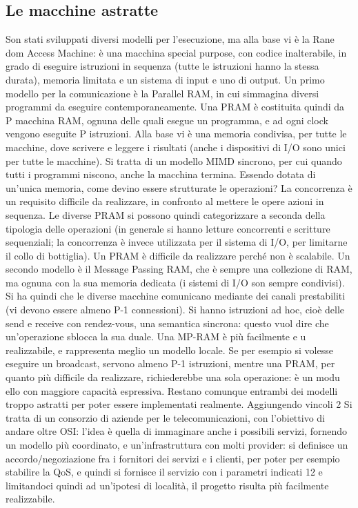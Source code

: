 \subsection{Le macchine astratte}
Son stati sviluppati diversi modelli per l'esecuzione, ma alla base vi è la Rane
dom Access Machine: è una macchina special purpose, con codice inalterabile,
in grado di eseguire istruzioni in sequenza (tutte le istruzioni hanno la stessa
durata), memoria limitata e un sistema di input e uno di output.
Un primo modello per la comunicazione è la Parallel RAM, in cui simmagina
diversi programmi da eseguire contemporaneamente. Una PRAM è costituita
quindi da P macchina RAM, ognuna delle quali esegue un programma, e ad ogni
clock vengono eseguite P istruzioni. Alla base vi è una memoria condivisa, per
tutte le macchine, dove scrivere e leggere i risultati (anche i dispositivi di I/O
sono unici per tutte le macchine). Si tratta di un modello MIMD sincrono, per
cui quando tutti i programmi niscono, anche la macchina termina. Essendo
dotata di un'unica memoria, come devino essere strutturate le operazioni? La
concorrenza è un requisito difficile da realizzare, in confronto al mettere le opere
azioni in sequenza. Le diverse PRAM si possono quindi categorizzare a seconda
della tipologia delle operazioni (in generale si hanno letture concorrenti e scritture sequenziali; la concorrenza è
invece utilizzata per il sistema di I/O, per
limitarne il collo di bottiglia). Un PRAM è difficile da realizzare perché non è
scalabile.
Un secondo modello è il Message Passing RAM, che è sempre una collezione
di RAM, ma ognuna con la sua memoria dedicata (i sistemi di I/O son sempre
condivisi). Si ha quindi che le diverse macchine comunicano mediante dei canali
prestabiliti (vi devono essere almeno P-1 connessioni). Si hanno istruzioni ad
hoc, cioè delle send e receive con rendez-vous, una semantica sincrona: questo
vuol dire che un'operazione sblocca la sua duale. Una MP-RAM è più facilmente
e u
realizzabile, e rappresenta meglio un modello locale. Se per esempio si volesse
eseguire un broadcast, servono almeno P-1 istruzioni, mentre una PRAM, per
quanto più difficile da realizzare, richiederebbe una sola operazione: è un modu
ello con maggiore capacità espressiva. Restano comunque entrambi dei modelli
troppo astratti per poter essere implementati realmente. Aggiungendo vincoli
2 Si tratta di un consorzio di aziende per le telecomunicazioni, con l'obiettivo di andare
oltre OSI: l'idea è quella di immaginare anche i possibili servizi, fornendo un modello più
coordinato, e un'infrastruttura con molti provider: si definisce un accordo/negoziazione fra i
fornitori dei servizi e i clienti, per poter per esempio stabilire la QoS, e quindi si fornisce il
servizio con i parametri indicati
12
e limitandoci quindi ad un'ipotesi di località, il progetto risulta più facilmente
realizzabile.
